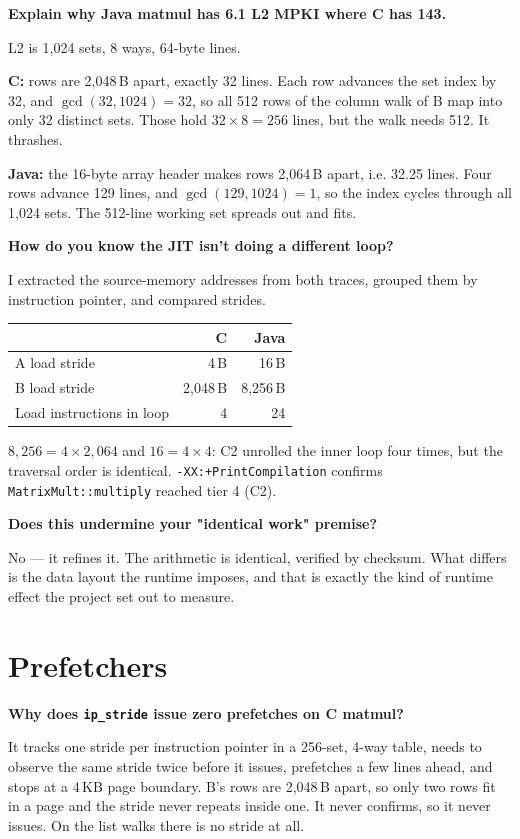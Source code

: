 \documentclass[11pt,a4paper]{article}
\newcommand{\Q}[1]{\begin{question}\textbf{#1}\end{question}}
\begin{document}
\Q{Explain why Java matmul has 6.1 L2 MPKI where C has 143.}

L2 is 1{,}024 sets, 8 ways, 64-byte lines.

\textbf{C:} rows are 2{,}048\,B apart, exactly 32 lines. Each row advances the set index
by 32, and $\gcd(32, 1024) = 32$, so all 512 rows of the column walk of B map into only
32 distinct sets. Those hold $32 \times 8 = 256$ lines, but the walk needs 512. It thrashes.

\textbf{Java:} the 16-byte array header makes rows 2{,}064\,B apart, i.e. 32.25 lines.
Four rows advance 129 lines, and $\gcd(129, 1024) = 1$, so the index cycles through all
1{,}024 sets. The 512-line working set spreads out and fits.

\Q{How do you know the JIT isn't doing a different loop?}

I extracted the source-memory addresses from both traces, grouped them by instruction
pointer, and compared strides.

\begin{center}
\begin{tabular}{lrr}
\toprule
& \textbf{C} & \textbf{Java} \\
\midrule
A load stride & 4\,B & 16\,B \\
B load stride & 2{,}048\,B & 8{,}256\,B \\
Load instructions in loop & 4 & 24 \\
\bottomrule
\end{tabular}
\end{center}

$8{,}256 = 4 \times 2{,}064$ and $16 = 4 \times 4$: C2 unrolled the inner loop four
times, but the traversal order is identical. \texttt{-XX:+PrintCompilation} confirms
\texttt{MatrixMult::multiply} reached tier 4 (C2).

\Q{Does this undermine your "identical work" premise?}

No --- it refines it. The arithmetic is identical, verified by checksum. What differs is
the data layout the runtime imposes, and that is exactly the kind of runtime effect the
project set out to measure.

\section{Prefetchers}

\Q{Why does \texttt{ip\_stride} issue zero prefetches on C matmul?}

It tracks one stride per instruction pointer in a 256-set, 4-way table, needs to observe
the same stride twice before it issues, prefetches a few lines ahead, and stops at a
4\,KB page boundary. B's rows are 2{,}048\,B apart, so only two rows fit in a page and the
stride never repeats inside one. It never confirms, so it never issues. On the list walks
there is no stride at all.
\end{document}
